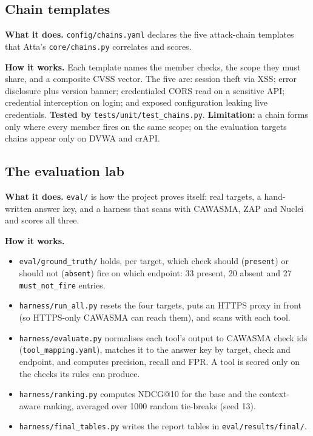 \subsection{Chain templates}
\textbf{What it does.} \texttt{config/chains.yaml} declares the five attack-chain
templates that Atta's \texttt{core/chains.py} correlates and scores.

\textbf{How it works.} Each template names the member checks, the scope they must
share, and a composite CVSS vector. The five are: session theft via XSS; error
disclosure plus version banner; credentialed CORS read on a sensitive API;
credential interception on login; and exposed configuration leaking live
credentials. \textbf{Tested by} \texttt{tests/unit/test\_chains.py}.
\textbf{Limitation:} a chain forms only where every member fires on the same
scope; on the evaluation targets chains appear only on DVWA and crAPI.

\subsection{The evaluation lab}
\textbf{What it does.} \texttt{eval/} is how the project proves itself: real
targets, a hand-written answer key, and a harness that scans with CAWASMA, ZAP
and Nuclei and scores all three.

\textbf{How it works.}
\begin{itemize}
\item \texttt{eval/ground\_truth/} holds, per target, which check should
(\texttt{present}) or should not (\texttt{absent}) fire on which endpoint: 33
present, 20 absent and 27 \texttt{must\_not\_fire} entries.
\item \texttt{harness/run\_all.py} resets the four targets, puts an HTTPS proxy
in front (so HTTPS-only CAWASMA can reach them), and scans with each tool.
\item \texttt{harness/evaluate.py} normalises each tool's output to CAWASMA check
ids (\texttt{tool\_mapping.yaml}), matches it to the answer key by target, check
and endpoint, and computes precision, recall and FPR. A tool is scored only on
the checks its rules can produce.
\item \texttt{harness/ranking.py} computes NDCG@10 for the base and the
context-aware ranking, averaged over 1000 random tie-breaks (seed 13).
\item \texttt{harness/final\_tables.py} writes the report tables in
\texttt{eval/results/final/}.
\end{itemize}

